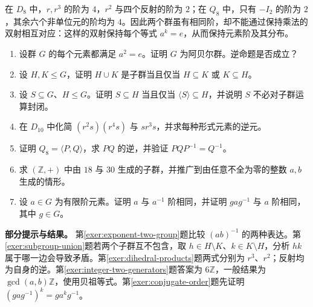\begin{example}[区分两个八阶群]
在 $D_8$ 中，$r,r^3$ 的阶为 $4$，$r^2$ 与四个反射的阶为 $2$；在 $Q_8$ 中，只有 $-I_2$ 的阶为 $2$，其余六个非单位元的阶均为 $4$。因此两个群虽有相同阶，却不能通过保持乘法的双射相互对应：这样的双射保持每个等式 $a^k=e$，从而保持元素阶及其分布。
\end{example}

\begin{enumerate}
  \item\label{exer:exponent-two-group} 设群 $G$ 的每个元素都满足 $a^2=e$。证明 $G$ 为阿贝尔群。逆命题是否成立？
  \item\label{exer:subgroup-union} 设 $H,K\leq G$，证明 $H\cup K$ 是子群当且仅当 $H\subseteq K$ 或 $K\subseteq H$。
  \item\label{exer:generated-minimality} 设 $S\subseteq G$、$H\leq G$。证明 $S\subseteq H$ 当且仅当 $\langle S\rangle\subseteq H$，并说明 $S$ 不必对子群运算封闭。
  \item\label{exer:dihedral-products} 在 $D_{10}$ 中化简 $(r^2s)(r^4s)$ 与 $sr^3s$，并求每种形式元素的逆元。
  \item\label{exer:quaternion-relations} 证明 $Q_8=\langle P,Q\rangle$，求 $PQ$ 的逆，并验证 $PQP^{-1}=Q^{-1}$。
  \item\label{exer:integer-two-generators} 求 $(\mathbb Z,+)$ 中由 $18$ 与 $30$ 生成的子群，并推广到由任意不全为零的整数 $a,b$ 生成的情形。
  \item\label{exer:conjugate-order} 设 $a\in G$ 为有限阶元素。证明 $a$ 与 $a^{-1}$ 阶相同，并证明 $gag^{-1}$ 与 $a$ 阶相同，其中 $g\in G$。
\end{enumerate}

\textbf{部分提示与结果。} 第\ref{exer:exponent-two-group}题比较 $(ab)^{-1}$ 的两种表达。第\ref{exer:subgroup-union}题若两个子群互不包含，取 $h\in H\setminus K$、$k\in K\setminus H$，分析 $hk$ 属于哪一边会导致矛盾。第\ref{exer:dihedral-products}题两式分别为 $r^3$、$r^2$；反射均为自身的逆。第\ref{exer:integer-two-generators}题答案为 $6\mathbb Z$，一般结果为 $\gcd(a,b)\mathbb Z$，使用贝祖等式。第\ref{exer:conjugate-order}题先证明 $(gag^{-1})^k=ga^kg^{-1}$。

